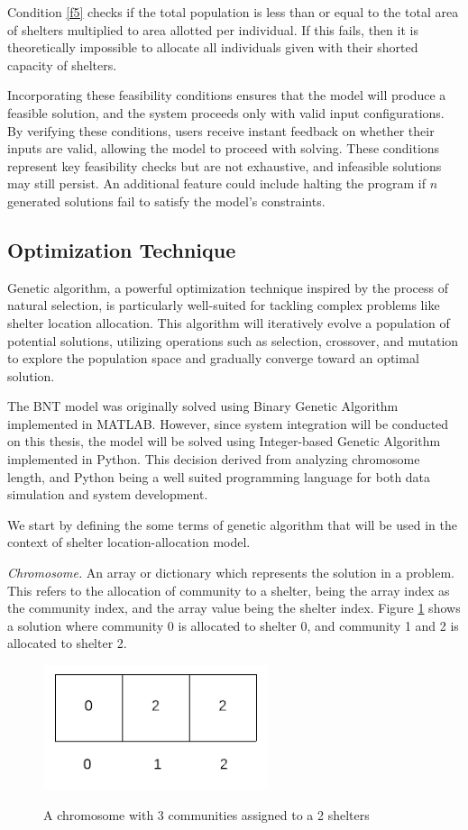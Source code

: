 	Condition \ref{f5} checks if the total population is less than or equal to the total area of shelters multiplied to area allotted per individual. If this fails, then it is theoretically impossible to allocate all individuals given with their shorted capacity of shelters.
	
	Incorporating these feasibility conditions ensures that the model will produce a feasible solution, and the system proceeds only with valid input configurations. By verifying these conditions, users receive instant feedback on whether their inputs are valid, allowing the model to proceed with solving. These conditions represent key feasibility checks but are not exhaustive, and infeasible solutions may still persist. An additional feature could include halting the program if $n$ generated solutions fail to satisfy the model's constraints.	
	
\subsection{Optimization Technique}
	Genetic algorithm, a powerful optimization technique inspired by the process of natural selection, is particularly well-suited for tackling complex problems like shelter location allocation. This algorithm will iteratively evolve a population of potential solutions, utilizing operations such as selection, crossover, and mutation to explore the population space and gradually converge toward an optimal solution.
	
	The BNT model was originally solved using Binary Genetic Algorithm implemented in MATLAB. However, since system integration will be conducted on this thesis, the model will be solved using Integer-based Genetic Algorithm implemented in Python. This decision derived from analyzing chromosome length, and Python being a well suited programming language for both data simulation and system development.
	
	We start by defining the some terms of genetic algorithm that will be used in the context of shelter location-allocation model.
	
	\textit{Chromosome.}  An array or dictionary which represents the  solution in a problem. This refers to the allocation of community to a shelter, being the array index as the community index, and the array value being the shelter index. Figure \ref{Chromosome} shows a solution where community 0 is allocated to shelter 0, and community 1 and 2 is allocated to shelter 2.
	
	\begin{figure}[h!]
		\caption{A chromosome with 3 communities assigned to a 2 shelters}
		\centering
		\includegraphics[width=250px]{Chromosome}
		\label{Chromosome}
	\end{figure}
	
